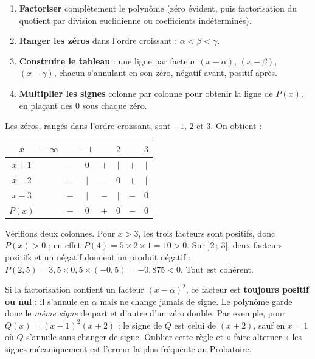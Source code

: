 \documentclass[11pt]{article}
\begin{document}
\begin{methode}
\begin{enumerate}
\item \textbf{Factoriser} complètement le polynôme (zéro évident, puis factorisation du quotient par division euclidienne ou coefficients indéterminés).
\item \textbf{Ranger les zéros} dans l'ordre croissant : $\alpha < \beta < \gamma$.
\item \textbf{Construire le tableau} : une ligne par facteur $(x - \alpha)$, $(x - \beta)$, $(x - \gamma)$, chacun s'annulant en son zéro, négatif avant, positif après.
\item \textbf{Multiplier les signes} colonne par colonne pour obtenir la ligne de $P(x)$, en plaçant des $0$ sous chaque zéro.
\end{enumerate}
\end{methode}

\begin{exemplebox}[Tableau de signes de $P(x) = (x+1)(x-2)(x-3)$]
Les zéros, rangés dans l'ordre croissant, sont $-1$, $2$ et $3$. On obtient :

\begin{center}
\begin{tabular}{|c|ccccccc|}
\hline
$x$ & $-\infty$ & & $-1$ & & $2$ & & $3$ \\
\hline
$x+1$ & & $-$ & $0$ & $+$ & $|$ & $+$ & $|$ \\
\hline
$x-2$ & & $-$ & $|$ & $-$ & $0$ & $+$ & $|$ \\
\hline
$x-3$ & & $-$ & $|$ & $-$ & $|$ & $-$ & $0$ \\
\hline
$P(x)$ & & $-$ & $0$ & $+$ & $0$ & $-$ & $0$ \\
\hline
\end{tabular}
\end{center}

Vérifions deux colonnes. Pour $x > 3$, les trois facteurs sont positifs, donc $P(x) > 0$ ; en effet $P(4) = 5 \times 2 \times 1 = 10 > 0$. Sur $]2\,;\,3[$, deux facteurs positifs et un négatif donnent un produit négatif : $P(2{,}5) = 3{,}5 \times 0{,}5 \times (-0{,}5) = -0{,}875 < 0$. Tout est cohérent.
\end{exemplebox}

\begin{attention}
Si la factorisation contient un facteur $(x - \alpha)^2$, ce facteur est \textbf{toujours positif ou nul} : il s'annule en $\alpha$ mais ne change jamais de signe. Le polynôme garde donc le \emph{même signe} de part et d'autre d'un zéro double. Par exemple, pour $Q(x) = (x-1)^2(x+2)$ : le signe de $Q$ est celui de $(x+2)$, sauf en $x = 1$ où $Q$ s'annule sans changer de signe. Oublier cette règle et « faire alterner » les signes mécaniquement est l'erreur la plus fréquente au Probatoire.
\end{attention}
\end{document}
